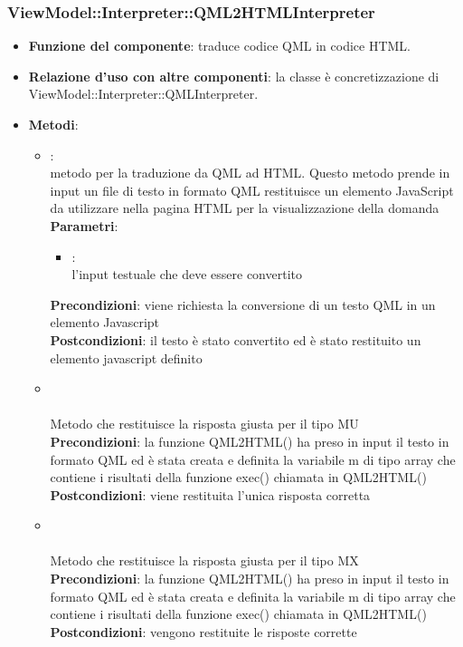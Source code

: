 \subsubsection{ViewModel::Interpreter::QML2HTMLInterpreter}
\begin{itemize}
	\item\textbf{Funzione del componente}: traduce codice QML in codice HTML.
	\item\textbf{Relazione d'uso con altre componenti}: la classe è concretizzazione di\\ ViewModel::Interpreter::QMLInterpreter.\\
	\item\textbf{Metodi}:
	\begin{itemize}
		\item{}:\\
		 metodo per la traduzione da QML ad HTML. Questo metodo prende in input un file di testo in formato QML restituisce un elemento JavaScript da utilizzare nella pagina HTML per la visualizzazione della domanda \\
		\textbf{Parametri}:
			\begin{itemize}
				\item{}:\\
				 l'input testuale che deve essere convertito \\
			\end{itemize}
		\textbf{Precondizioni}: viene richiesta la conversione di un testo QML in un elemento Javascript\\
		\textbf{Postcondizioni}: il testo è stato convertito ed è stato restituito un elemento javascript definito\\
		\item{}\\
		 \\Metodo che restituisce la risposta giusta per il tipo MU\\
		\textbf{Precondizioni}: la funzione QML2HTML() ha preso in input il testo in formato QML ed è stata creata e definita la variabile m di tipo array che contiene i risultati della funzione exec() chiamata in QML2HTML()\\
		\textbf{Postcondizioni}: viene restituita l'unica risposta corretta \\
		
		\item{}\\
		 \\Metodo che restituisce la risposta giusta per il tipo MX\\
		\textbf{Precondizioni}: la funzione QML2HTML() ha preso in input il testo in formato QML ed è stata creata e definita la variabile m di tipo array che contiene i risultati della funzione exec() chiamata in QML2HTML()\\
		\textbf{Postcondizioni}: vengono restituite le risposte corrette \\
		

\end{itemize}
\end{itemize}
